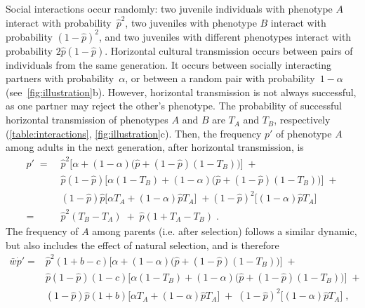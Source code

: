\documentclass[12pt]{extarticle}
\begin{document}
Social interactions occur randomly:
two juvenile individuals with phenotype $A$ interact with probability~$\hat{p}^2$, two juveniles with phenotype $B$ interact with probability $(1-\hat{p})^2$, and two juveniles with different phenotypes interact with probability $2\hat{p}(1-\hat{p})$. 
Horizontal cultural transmission occurs between pairs of individuals from the same generation. 
It occurs between socially interacting partners with probability~$\alpha$, or between a random pair with probability~$1-\alpha$ (see~\autoref{fig:illustration}b).
However, horizontal transmission is not always successful, as one partner may reject the other's phenotype.
The probability of successful horizontal transmission of phenotypes $A$ and $B$ are $T_A$ and $T_B$, respectively (\autoref{table:interactions}, \autoref{fig:illustration}c).
Then, the frequency $p'$ of phenotype $A$ among adults in the next generation, after horizontal transmission, is 
\begin{equation}\label{eq:nextgen_adults}
\begin{aligned}
p' \;= \;
& \hat{p}^2 \big[\alpha + (1-\alpha)\big(\hat{p} + (1-\hat{p})(1-T_B)\big)\big] \;+ \\
& \hat{p}(1-\hat{p}) \big[\alpha(1-T_B) + (1-\alpha)\big(\hat{p} + (1-\hat{p})(1-T_B)\big)\big] \;+ \\
& (1-\hat{p})\hat{p} \big[\alpha T_A + (1-\alpha) \hat{p} T_A \big] \;+ 
(1-\hat{p})^2 \big[(1-\alpha) \hat{p} T_A \big] \\
=\; & \hat{p}^2(T_B-T_A) \;+\; \hat{p}(1+T_A-T_B) \;.
\end{aligned}
\end{equation}
The frequency of $A$ among parents (i.e. after selection) follows a similar dynamic, but also includes the effect of natural selection, and is therefore
\begin{equation}\label{eq:nextgen_parents}
\begin{aligned}
\bar{w} \dot{p}' =
& \hat{p}^2 (1+b-c) \big[\alpha + (1-\alpha)\big(\hat{p} + (1-\hat{p})(1-T_B)\big)\big] \;+ \\
& \hat{p}(1-\hat{p}) (1-c) \big[\alpha(1-T_B) + (1-\alpha)\big(\hat{p} + (1-\hat{p})(1-T_B)\big)\big] \;+ \\
& (1-\hat{p})\hat{p} (1+b) \big[\alpha T_A + (1-\alpha) \hat{p} T_A \big] \;+\; 
(1-\hat{p})^2 \big[(1-\alpha) \hat{p} T_A \big] \;,
\end{aligned}
\end{equation}
\end{document}
